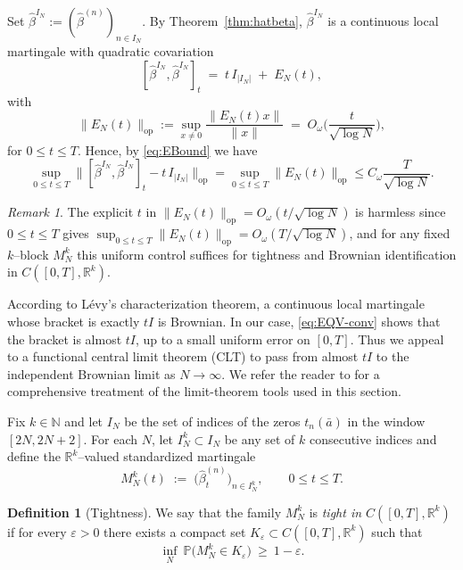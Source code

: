 \documentclass[12pt,reqno]{amsart}
\theoremstyle{plain}
\theoremstyle{definition}
\newtheorem{dfn}{Definition}[section]   %
\theoremstyle{remark}
\newtheorem{rem}{Remark}[section]       %
\begin{document}
Set $\hat\beta^{I_N}:=(\hat\beta^{(n)})_{n\in I_N}$. By Theorem~\ref{thm:hatbeta}, $\hat\beta^{I_N}$ is a continuous local martingale with quadratic covariation
\begin{equation}
\label{eq:EBound}
[ \hat\beta^{I_N},\hat\beta^{I_N}]_t \;=\; t\,I_{|I_N|} \;+\; E_N(t),
\end{equation}
with 
\begin{equation}
\|E_N(t)\|_{\mathrm{op}}:=\sup_{x \neq 0}\frac{\|E_N(t)x\|}{\|x\|} \;=\; O_\omega\!\Big(\frac{t}{\sqrt{\log N}}\Big),
\end{equation}
for $0\le t\le T$. Hence, by \eqref{eq:EBound} we have
\begin{equation}\label{eq:EQV-conv}
\sup_{0\le t\le T}\big\| [\hat\beta^{I_N} ,\hat\beta^{I_N} ]_t  - t\,I_{|I_N|}\big\|_{\mathrm{op}}
=\sup_{0\le t\le T}\|E_N(t)\|_{\mathrm{op}}
\leq C_{\omega} \frac{T}{\sqrt{\log N}}.
\end{equation}

\begin{rem}
The explicit $t$ in $\|E_N(t)\|_{\mathrm{op}}=O_\omega(t/\sqrt{\log N})$ is harmless since $0\le t\le T$ gives $\sup_{0\le t\le T}\|E_N(t)\|_{\mathrm{op}}=O_\omega(T/\sqrt{\log N})$, and for any fixed $k$–block $M_N^k$ this uniform control suffices for tightness and Brownian identification in $C([0,T],\mathbb{R}^k)$.
\end{rem}


According to Lévy's characterization theorem, a continuous local martingale whose
bracket is exactly $tI$ is Brownian. In our case, \eqref{eq:EQV-conv} shows that the bracket is almost
$tI$, up to a small uniform error on $[0,T]$.  
Thus we appeal to a functional central limit theorem (CLT) to pass from almost $tI$ to the independent Brownian limit as $N \rightarrow \infty$. We refer the reader to \cite{JS} for a comprehensive treatment of the limit-theorem tools used in this section. 

Fix $k\in\mathbb{N}$ and let $I_N$ be the set of indices of the zeros $t_n(\bar a)$ in the window $[2N,2N+2]$. 
For each $N$, let $I_N^k\subset I_N$ be any set of $k$ consecutive indices and define the $\mathbb{R}^k$–valued standardized martingale
\begin{equation}
M_N^{k}(t)\;:=\;\big(\hat\beta^{(n)}_t\big)_{n\in I_N^k},\qquad 0\le t\le T.
\end{equation}

\begin{dfn}[Tightness]
We say that the family $M^{k}_N$ is \emph{tight in $C([0,T],\mathbb{R}^{k})$} if for every $\varepsilon>0$ there exists a compact set 
$K_\varepsilon\subset C([0,T],\mathbb{R}^{k})$ such that
\begin{equation}
\inf_{N}\ \mathbb{P}\big(M^{k}_N \in K_\varepsilon\big)\ \ge\ 1-\varepsilon.
\end{equation}
\end{dfn}
\end{document}
